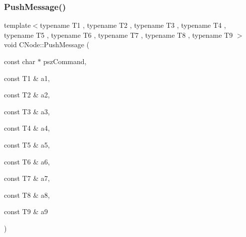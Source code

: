 \mbox{\label{class_c_node_a1af04d8219e8e6aafe5b6446000cd9ff}} 
\subsubsection{\texorpdfstring{Push\+Message()}{PushMessage()}\hspace{0.1cm}{\footnotesize\ttfamily [10/13]}}
{\footnotesize\ttfamily template$<$typename T1 , typename T2 , typename T3 , typename T4 , typename T5 , typename T6 , typename T7 , typename T8 , typename T9 $>$ \\
void C\+Node\+::\+Push\+Message (\begin{DoxyParamCaption}\item[{const char $\ast$}]{psz\+Command,  }\item[{const T1 \&}]{a1,  }\item[{const T2 \&}]{a2,  }\item[{const T3 \&}]{a3,  }\item[{const T4 \&}]{a4,  }\item[{const T5 \&}]{a5,  }\item[{const T6 \&}]{a6,  }\item[{const T7 \&}]{a7,  }\item[{const T8 \&}]{a8,  }\item[{const T9 \&}]{a9 }\end{DoxyParamCaption})\hspace{0.3cm}{\ttfamily [inline]}}

\mbox{\label{class_c_node_a64f2ffdff9a32458d6fede8324dfd59f}} 
